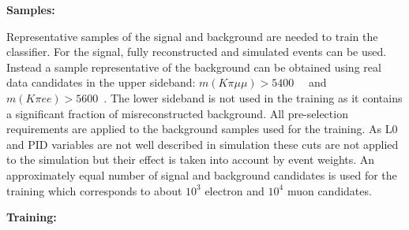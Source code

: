 {\bf Samples:}

Representative samples of the signal and background are needed to train the classifier.
For the signal, fully reconstructed \BdToKstmm and \BdKstee simulated events can be used.
Instead a sample representative of the background can be obtained using real data candidates
in the upper \Bz sideband: $m(K\pi\mu\mu) > 5400$~\mevcc~ and $m(K\pi ee) > 5600$~\mevcc.
The lower sideband is not used in the training as it contains a significant fraction of misreconstructed background.
All pre-selection requirements are applied to the background samples used for the training.
As L0 and PID variables are not well described in simulation these cuts are not applied to the simulation
but their effect is taken into account by event weights.
An approximately equal number of signal and background candidates is used for the training
which corresponds to about $10^3$ electron and $10^4$ muon candidates.

{\bf Training:}

